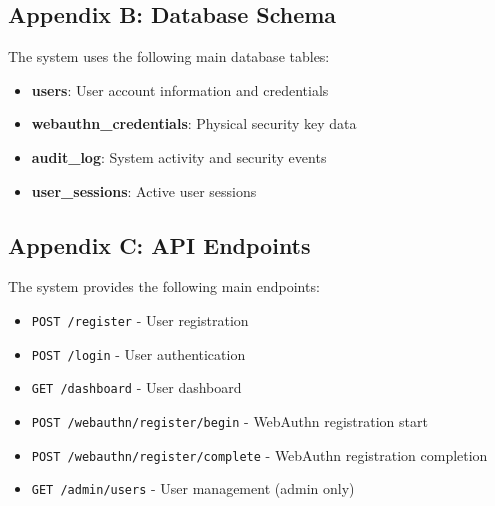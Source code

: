 \documentclass[12pt,a4paper]{article}
\begin{document}
\subsection{Appendix B: Database Schema}
The system uses the following main database tables:
\begin{itemize}
    \item \textbf{users}: User account information and credentials
    \item \textbf{webauthn\_credentials}: Physical security key data
    \item \textbf{audit\_log}: System activity and security events
    \item \textbf{user\_sessions}: Active user sessions
\end{itemize}

\subsection{Appendix C: API Endpoints}
The system provides the following main endpoints:
\begin{itemize}
    \item \texttt{POST /register} - User registration
    \item \texttt{POST /login} - User authentication
    \item \texttt{GET /dashboard} - User dashboard
    \item \texttt{POST /webauthn/register/begin} - WebAuthn registration start
    \item \texttt{POST /webauthn/register/complete} - WebAuthn registration completion
    \item \texttt{GET /admin/users} - User management (admin only)
\end{itemize}
\end{document}
